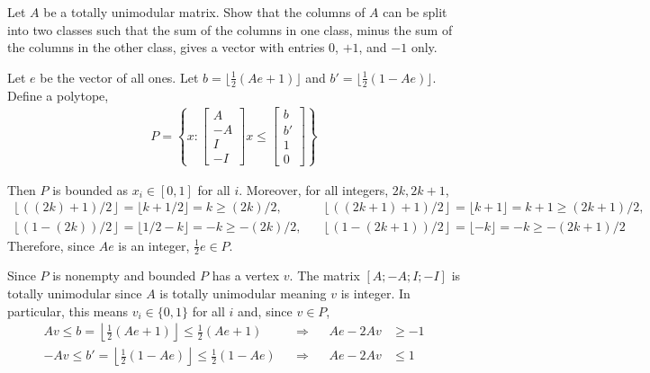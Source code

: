 \documentclass[10pt]{article}
\begin{document}
\maketitle



\begin{problem}[Problem 8.8]
Let \( A \) be a totally unimodular matrix. Show that the columns of \( A \) can be split into two classes such that the sum of the columns in one class, minus the sum of the columns in the other class, gives a vector with entries \( 0 \), \( +1 \), and \( -1 \) only.
\end{problem}

\begin{solution}

Let \( e \) be the vector of all ones. Let \( b = \lfloor \frac{1}{2} (Ae+1) \rfloor \) and \( b' = \lfloor \frac{1}{2} (1-Ae) \rfloor \).  Define a polytope,
\begin{align*}
    P = \left\{ x: \left[\begin{array}{r}A \\ -A \\ I \\ -I \end{array}\right]x \leq \left[\begin{array}{l}b \\ b' \\ 1 \\0\end{array}\right] \right\}
\end{align*}

Then \( P \) is bounded as \( x_i\in[0,1] \) for all \( i \). Moreover, for all integers, \( 2k,2k+1 \),
\begin{align*}
    \left\lfloor ((2k)+1)/2  \right\rfloor = \lfloor k+ 1/2 \rfloor = k \geq (2k)/2,
    && \left\lfloor ((2k+1)+1)/2  \right\rfloor = \lfloor k+1 \rfloor = k+1 \geq (2k+1)/2,
    \\\left\lfloor (1-(2k))/2  \right\rfloor = \lfloor 1/2-k \rfloor = -k \geq - (2k)/2,
    && \left\lfloor (1-(2k+1))/2  \right\rfloor = \lfloor -k \rfloor = -k \geq -(2k+1)/2
\end{align*}
Therefore, since \( Ae \) is an integer, \( \frac{1}{2} e \in P \). 

Since \( P \) is nonempty and bounded \( P \) has a vertex \( v \). The matrix \( [A; -A; I; -I] \) is totally unimodular since \( A \) is totally unimodular meaning \( v \) is integer. In particular, this means \( v_i\in\{0,1\} \) for all \( i \) and, since \( v\in P \),
\begin{align*}
    Av \leq b = \left\lfloor \frac{1}{2} (Ae+1) \right\rfloor \leq \frac{1}{2} (Ae+1) && \Longrightarrow &&
    Ae - 2Av &\geq - 1 \\
    -Av \leq b' = \left\lfloor \frac{1}{2} (1-Ae) \right\rfloor \leq \frac{1}{2} (1-Ae) && \Longrightarrow &&
    Ae - 2Av &\leq 1
\end{align*}


\end{solution}
\end{document}
